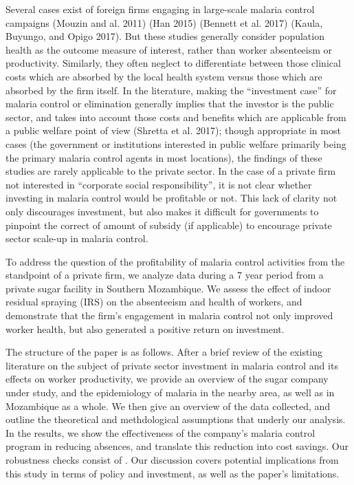 \documentclass[]{article}
\begin{document}
Several cases exist of foreign firms engaging in large-scale malaria
control campaigns (Mouzin and al. 2011) (Han 2015) (Bennett et al. 2017)
(Kaula, Buyungo, and Opigo 2017). But these studies generally consider
population health as the outcome measure of interest, rather than worker
absenteeism or productivity. Similarly, they often neglect to
differentiate between those clinical costs which are absorbed by the
local health system versus those which are absorbed by the firm itself.
In the literature, making the ``investment case'' for malaria control or
elimination generally implies that the investor is the public sector,
and takes into account those costs and benefits which are applicable
from a public welfare point of view (Shretta et al. 2017); though
appropriate in most cases (the government or institutions interested in
public welfare primarily being the primary malaria control agents in
most locations), the findings of these studies are rarely applicable to
the private sector. In the case of a private firm not interested in
``corporate social responsibility'', it is not clear whether investing
in malaria control would be profitable or not. This lack of clarity not
only discourages investment, but also makes it difficult for governments
to pinpoint the correct of amount of subsidy (if applicable) to
encourage private sector scale-up in malaria control.

To address the question of the profitability of malaria control
activities from the standpoint of a private firm, we analyze data during
a 7 year period from a private sugar facility in Southern Mozambique. We
assess the effect of indoor residual spraying (IRS) on the absenteeism
and health of workers, and demonstrate that the firm's engagement in
malaria control not only improved worker health, but also generated a
positive return on investment.

The structure of the paper is as follows. After a brief review of the
existing literature on the subject of private sector investment in
malaria control and its effects on worker productivity, we provide an
overview of the sugar company under study, and the epidemiology of
malaria in the nearby area, as well as in Mozambique as a whole. We then
give an overview of the data collected, and outline the theoretical and
methdological assumptions that underly our analysis. In the results, we
show the effectiveness of the company's malaria control program in
reducing absences, and translate this reduction into cost savings. Our
robustness checks consist of . Our discussion
covers potential implications from this study in terms of policy and
investment, as well as the paper's limitations.
\end{document}
